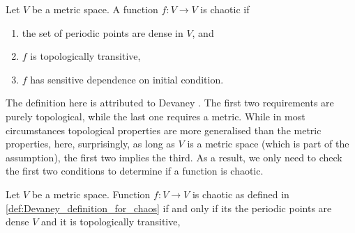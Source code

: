 \begin{defn}\label{def:Devaney_definition_for_chaos}
	Let $V$ be a metric space.
	A function $f: V \rightarrow V$ is chaotic if
	\begin{enumerate}
		\item the set of periodic points are dense in $V$, and
		\item $f$ is topologically transitive,
		\item $f$ has sensitive dependence on initial condition. 
	\end{enumerate}
	
\end{defn}


The definition here is attributed to Devaney \cite{Devaney_green_book_chaos_definition}. 
The first two requirements are purely topological, while the last one requires a metric. 
While in most circumstances topological properties are more generalised than the metric properties, here, surprisingly, as long as $V$ is a metric space (which is part of the assumption), the first two implies the third\cite{Banks}. 
As a result, we only need to check the first two conditions to determine if a function is chaotic.

\begin{thm}
	Let $V$ be a metric space. 
	Function $f: V \rightarrow V$ is chaotic as defined in \ref{def:Devaney_definition_for_chaos}
	if and only if its the periodic points are dense $V$ and it is topologically transitive,
\end{thm}


